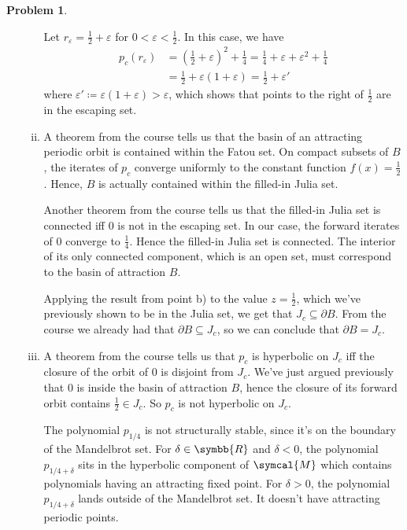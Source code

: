 \documentclass[a4paper, 12pt]{article}
\theoremstyle{definition}
\newtheorem{problem}{Problem}
\newcommand*{\reals}{\symbb{R}}
\begin{document}
\begin{problem}
\begin{enumerate}[a)]
\begin{enumerate}[i)]
        Let \(r_{\varepsilon} = \frac{1}{2} + \varepsilon\) for \(0 < \varepsilon < \frac{1}{2}\). In this case, we have
        \begin{align*}
            p_c \left(r_{\varepsilon}\right) &= \left(\frac{1}{2} + \varepsilon\right)^2 + \frac{1}{4}
            = \frac{1}{4} + \varepsilon + \varepsilon^2 + \frac{1}{4} \\[0.5em]
            &= \frac{1}{2} + \varepsilon(1 + \varepsilon) = \frac{1}{2} + \varepsilon'
        \end{align*}
        where \(\varepsilon' \coloneq \varepsilon(1 + \varepsilon) > \varepsilon\), which shows that points to the right of \(\frac{1}{2}\) are in the escaping set.

        \item A theorem from the course tells us that the basin of an attracting periodic orbit is contained within the Fatou set. On compact subsets of \(B\), the iterates of \(p_c\) converge uniformly to the constant function \(f(x) = \frac{1}{2}\). Hence, \(B\) is actually contained within the filled-in Julia set.

        Another theorem from the course tells us that the filled-in Julia set is connected iff \(0\) is not in the escaping set. In our case, the forward iterates of \(0\) converge to \(\frac{1}{4}\). Hence the filled-in Julia set is connected. The interior of its only connected component, which is an open set, must correspond to the basin of attraction \(B\).

        Applying the result from point b) to the value \(z = \frac{1}{2}\), which we've previously shown to be in the Julia set, we get that \(J_c \subseteq \partial B\). From the course we already had that \(\partial B \subseteq J_c\), so we can conclude that \(\partial B = J_c\).

        \item A theorem from the course tells us that \(p_c\) is hyperbolic on \(J_c\) iff the closure of the orbit of \(0\) is disjoint from \(J_c\). We've just argued previously that \(0\) is inside the basin of attraction \(B\), hence the closure of its forward orbit contains \(\frac{1}{2} \in J_c\). So \(p_c\) is not hyperbolic on \(J_c\).

        The polynomial \(p_{1/4}\) is not structurally stable, since it's on the boundary of the Mandelbrot set. For \(\delta \in \reals\) and \(\delta < 0\), the polynomial \(p_{1/4 + \delta}\) sits in the hyperbolic component of \(\symcal{M}\) which contains polynomials having an attracting fixed point. For \(\delta > 0\), the polynomial \(p_{1/4 + \delta}\) lands outside of the Mandelbrot set. It doesn't have attracting periodic points.
    \end{enumerate}
\end{enumerate}
\end{problem}
\end{document}
